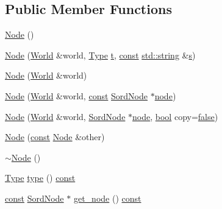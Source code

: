 \subsection*{Public Member Functions}
\begin{DoxyCompactItemize}
\item 
\hyperlink{class_sord_1_1_node_a71f069f1dd00a3977e598d766b6d7bb0}{Node} ()
\item 
\hyperlink{class_sord_1_1_node_aa23cd9d731134380906ce83d75481690}{Node} (\hyperlink{class_sord_1_1_world}{World} \&world, \hyperlink{class_sord_1_1_node_a7e88bd1ee36843d0ec897a11b83bb3bb}{Type} \hyperlink{octave__test_8m_aaccc9105df5383111407fd5b41255e23}{t}, \hyperlink{getopt1_8c_a2c212835823e3c54a8ab6d95c652660e}{const} \hyperlink{test__lib_f_l_a_c_2format_8c_ab02026ad0de9fb6c1b4233deb0a00c75}{std\+::string} \&\hyperlink{lib_2expat_8h_a755339d27872b13735c2cab829e47157}{s})
\item 
\hyperlink{class_sord_1_1_node_a8f7407c472e67ca9b7a6365dabc583aa}{Node} (\hyperlink{class_sord_1_1_world}{World} \&world)
\item 
\hyperlink{class_sord_1_1_node_a5d6d7bc2b77f31a95bb09476a83c751e}{Node} (\hyperlink{class_sord_1_1_world}{World} \&world, \hyperlink{getopt1_8c_a2c212835823e3c54a8ab6d95c652660e}{const} \hyperlink{group__sord_ga804ac7d56d9fdea50f2d1e7278b1f82b}{Sord\+Node} $\ast$\hyperlink{structnode}{node})
\item 
\hyperlink{class_sord_1_1_node_a294fd72dbefbbe61d1464231c4ff552f}{Node} (\hyperlink{class_sord_1_1_world}{World} \&world, \hyperlink{group__sord_ga804ac7d56d9fdea50f2d1e7278b1f82b}{Sord\+Node} $\ast$\hyperlink{structnode}{node}, \hyperlink{mac_2config_2i386_2lib-src_2libsoxr_2soxr-config_8h_abb452686968e48b67397da5f97445f5b}{bool} copy=\hyperlink{mac_2config_2i386_2lib-src_2libsoxr_2soxr-config_8h_a65e9886d74aaee76545e83dd09011727}{false})
\item 
\hyperlink{class_sord_1_1_node_a392d0369a38d6040d528860922e8c0db}{Node} (\hyperlink{getopt1_8c_a2c212835823e3c54a8ab6d95c652660e}{const} \hyperlink{class_sord_1_1_node}{Node} \&other)
\item 
\hyperlink{class_sord_1_1_node_ac5ec38de2e4a24bb6c37e6c4f565de13}{$\sim$\+Node} ()
\item 
\hyperlink{class_sord_1_1_node_a7e88bd1ee36843d0ec897a11b83bb3bb}{Type} \hyperlink{class_sord_1_1_node_ada3dbc3aa8ffaf00ac156e08ada5643d}{type} () \hyperlink{getopt1_8c_a2c212835823e3c54a8ab6d95c652660e}{const} 
\item 
\hyperlink{getopt1_8c_a2c212835823e3c54a8ab6d95c652660e}{const} \hyperlink{group__sord_ga804ac7d56d9fdea50f2d1e7278b1f82b}{Sord\+Node} $\ast$ \hyperlink{class_sord_1_1_node_aaea07993c642f76bbe93523e09b96c11}{get\+\_\+node} () \hyperlink{getopt1_8c_a2c212835823e3c54a8ab6d95c652660e}{const} 

\end{DoxyCompactItemize}
